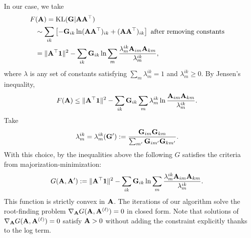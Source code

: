 In our case, we take
\begin{align*}
F&(\mathbf A)= \mathrm{KL}(\mathbf G|\mathbf A\mathbf A^\top)\\
&\sim \sum_{ik} \left[
-\mathbf G_{ik}\ln(\mathbf A\mathbf A^\top)_{ik}+(\mathbf A\mathbf A^\top)_{ik}
\right]\textrm{ after removing constants}\\
&=\|\mathbf A^\top\mathbf 1\|^2-\sum_{ik}\mathbf G_{ik}\ln \sum_m \frac{\lambda^{ik}_m \mathbf A_{im}\mathbf A_{km}}{\lambda^{ik}_m},
\end{align*}
where $\lambda$ is any set of constants satisfying $\sum_m\lambda^{ik}_m=1$ and $\lambda^{ik}_m\geq0.$  By Jensen's inequality,
$$F(\mathbf A)\leq \|\mathbf A^\top\mathbf 1\|^2-\sum_{ik}\mathbf G_{ik}\sum_m \lambda^{ik}_m\ln\frac{\mathbf A_{im}\mathbf A_{km}}{\lambda^{ik}_m}.$$
Take
$$\lambda^{ik}_m= \lambda^{ik}_m(\mathbf G'):=\frac{\mathbf G_{im}\mathbf G_{km}}{\sum_{m'} \mathbf G_{im'}\mathbf G_{km'}}.$$
With this choice, by the inequalities above the following $G$ satisfies the criteria from majorization-minimization:
$$G(\mathbf A,\mathbf A'):= \|\mathbf A^\top\mathbf 1\|^2-\sum_{ik}\mathbf G_{ik}\ln \sum_m \frac{\lambda^{ik}_m \mathbf A_{im}\mathbf A_{km}}{\lambda^{ik}_m}.$$
This function is strictly convex in $\mathbf A$. The iterations of our algorithm solve the root-finding problem $\nabla_\mathbf A G(\mathbf A,\mathbf A^{(\ell)})=0$ in closed form.  Note that solutions of $\nabla_\mathbf A G(\mathbf A,\mathbf A^{(\ell)})=0$ satisfy $\mathbf A>0$ without adding the constraint explicitly thanks to the log term.


